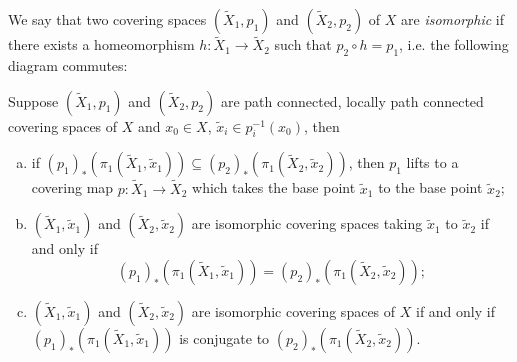 \begin{definition}
  We say that two covering spaces $(\widetilde{X}_1, p_1)$ and
  $(\widetilde{X}_2, p_2)$ of $X$ are \emph{isomorphic}
  if there exists a homeomorphism $h : \widetilde{X}_1 \to \widetilde{X}_2$
  such that $p_2 \circ h = p_1$, i.e. the following
  diagram commutes:
  \begin{center}
  \end{center}
\end{definition}

\begin{corollary}
  Suppose $(\widetilde{X}_1, p_1)$ and $(\widetilde{X}_2, p_2)$ are
  path connected, locally path connected covering spaces
  of $X$ and $x_0 \in X$, $\widetilde{x}_i \in p_i^{-1}(x_0)$,
  then
  \begin{enumerate}[(a)]
    \item if $(p_1)_*(\pi_1(\widetilde{X}_1, \widetilde{x}_1)) \subseteq
      (p_2)_*(\pi_1(\widetilde{X}_2, \widetilde{x}_2))$, then
      $p_1$ lifts to a covering map
      $p : \widetilde{X}_1 \to \widetilde{X}_2$ which takes
      the base point $\widetilde{x}_1$ to the
      base point $\widetilde{x}_2$;
    \item $(\widetilde{X}_1, \widetilde{x}_1)$ and
      $(\widetilde{X}_2, \widetilde{x}_2)$ are isomorphic
      covering spaces taking
      $\widetilde{x}_1$ to $\widetilde{x}_2$ if and only if
      \[
        (p_1)_*(\pi_1(\widetilde{X}_1, \widetilde{x}_1)) =
        (p_2)_*(\pi_1(\widetilde{X}_2, \widetilde{x}_2));
      \]
    \item $(\widetilde{X}_1, \widetilde{x}_1)$ and
      $(\widetilde{X}_2, \widetilde{x}_2)$ are isomorphic
      covering spaces of $X$ if and only if
      $(p_1)_*(\pi_1(\widetilde{X}_1, \widetilde{x}_1))$
      is conjugate to
      $(p_2)_*(\pi_1(\widetilde{X}_2, \widetilde{x}_2))$.
  \end{enumerate}
\end{corollary}

